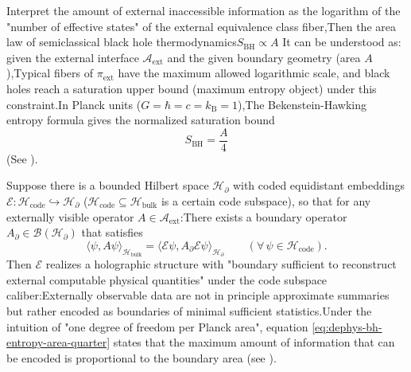 \begin{proposition}\label{prop:dephys-horizon-fiber-capacity-area-law}Interpret the amount of external inaccessible information as the logarithm of the "number of effective states" of the external equivalence class fiber,Then the area law of semiclassical black hole thermodynamics\(
S_{\mathrm{BH}}\propto A
\)
It can be understood as: given the external interface \(\mathcal{A}_{\mathrm{ext}}\) and the given boundary geometry (area \(A\)),Typical fibers of \(\pi_{\mathrm{ext}}\) have the maximum allowed logarithmic scale, and black holes reach a saturation upper bound (maximum entropy object) under this constraint.In Planck units (\(G=\hbar=c=k_{\mathrm B}=1\)),The Bekenstein-Hawking entropy formula gives the normalized saturation bound\begin{equation}\label{eq:dephys-bh-entropy-area-quarter}
\boxed{\;
S_{\mathrm{BH}}=\frac{A}{4}\;}
\end{equation}
(See \cite{Bekenstein1973BlackHolesEntropy,Hawking1975ParticleCreation}).\end{proposition}

\begin{theorem}\label{thm:dephys-holography-sufficient-statistic}Suppose there is a bounded Hilbert space \(\mathcal{H}_{\partial}\) with coded equidistant embeddings\(
\mathcal{E}:\mathcal{H}_{\mathrm{code}}\hookrightarrow \mathcal{H}_{\partial}
\)
(\(\mathcal{H}_{\mathrm{code}}\subseteq\mathcal{H}_{\mathrm{bulk}}\) is a certain code subspace), so that for any externally visible operator \(A\in\mathcal{A}_{\mathrm{ext}}\):There exists a boundary operator \(A_{\partial}\in\mathcal{B}(\mathcal{H}_{\partial})\) that satisfies\begin{equation}\label{eq:dephys-holography-reconstruction}
\boxed{\;
\langle\psi, A\psi\rangle_{\mathcal{H}_{\mathrm{bulk}}}
=
\langle\mathcal{E}\psi, A_{\partial}\mathcal{E}\psi\rangle_{\mathcal{H}_{\partial}}
\qquad(\forall\,\psi\in\mathcal{H}_{\mathrm{code}}).\;}
\end{equation}
Then \(\mathcal{E}\) realizes a holographic structure with "boundary sufficient to reconstruct external computable physical quantities" under the code subspace caliber:Externally observable data are not in principle approximate summaries but rather encoded as boundaries of minimal sufficient statistics.Under the intuition of "one degree of freedom per Planck area", equation \eqref{eq:dephys-bh-entropy-area-quarter} states that the maximum amount of information that can be encoded is proportional to the boundary area (see \cite{tHooft1993DimensionalReductionQuantumGravity,Susskind1995WorldAsHologram}).\end{theorem}


